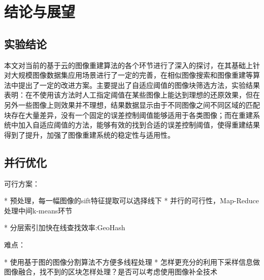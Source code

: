 
\chapter{结论与展望}

\section{实验结论}
本文对当前的基于云的图像重建算法的各个环节进行了深入的探讨，在其基础上针对大规模图像数据集应用场景进行了一定的完善，在相似图像搜索和图像重建等算法中提出了一定的改进方案。主要提出了自适应阈值的图像块筛选方法，实验结果表明：在不使用该方法时人工指定阈值在某些图像上能达到理想的还原效果，但在另外一些图像上则效果并不理想，结果数据显示由于不同图像之间不同区域的匹配块存在大量差异，没有一个固定的误差控制阈值能够适用于各类图像；而在重建系统中加入自适应阈值的方法，能够有效的找到合适的误差控制阈值，使得重建结果得到了提升，加强了图像重建系统的稳定性与适用性。

\section{并行优化}

可行方案：


* 预处理，每一幅图像的sift特征提取可以选择线下
   * 并行的可行性，Map-Reduce处理中间k-means环节

   * 分层索引加快在线查找效率:GeoHash


难点：


   * 使用基于图的图像分割算法不方便多线程处理
   * 怎样更充分的利用下采样信息做图像融合，找不到的区块怎样处理？是否可以考虑使用图像补全技术
